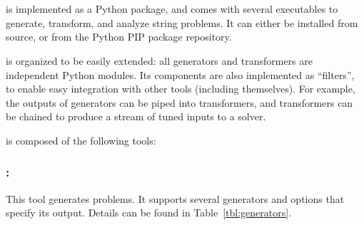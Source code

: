 \section{\fuzzer{}}
\label{sec:fuzzer}
\vspace{-0.1in}

    \fuzzer{} is implemented as a Python package, and comes with several executables to generate, transform, and analyze \smtfull{} string problems. It can either be installed from source, or from the Python PIP package repository. 
    

    \fuzzer{} is organized to be easily extended: all generators and transformers are independent Python modules. Its components are also implemented as \unix{} ``filters'', to enable easy integration with other tools (including themselves). For example, the outputs of generators can be piped into transformers, and transformers can be chained to produce a stream of tuned inputs to a solver. 
    
    \fuzzer{} is composed of the following tools:


\vspace{-0.15in}
\subsubsection{\generator{}:}

This tool generates \smt{} problems. It supports several generators and options that specify its output. Details can be found in Table~\ref{tbl:generators}.
    
    
    
